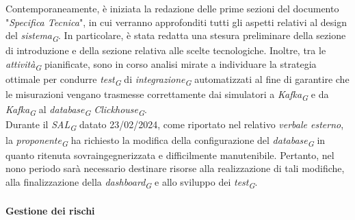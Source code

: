 Contemporaneamente, è iniziata la redazione delle prime sezioni del documento "\textit{Specifica Tecnica}", in cui verranno approfonditi tutti gli aspetti relativi al design del \textit{sistema}\textsubscript{\textit{G}}. In particolare, è stata redatta una stesura preliminare della sezione di introduzione e della sezione relativa alle scelte tecnologiche.
Inoltre, tra le \textit{attività}\textsubscript{\textit{G}} pianificate, sono in corso analisi mirate a individuare la strategia ottimale per condurre \textit{test}\textsubscript{\textit{G}} di \textit{integrazione}\textsubscript{\textit{G}} automatizzati al fine di garantire che le misurazioni vengano trasmesse correttamente dai simulatori a \textit{Kafka}\textsubscript{\textit{G}} e da \textit{Kafka}\textsubscript{\textit{G}} al \textit{database}\textsubscript{\textit{G}} \textit{Clickhouse}\textsubscript{\textit{G}}. \\
Durante il \textit{SAL}\textsubscript{\textit{G}} datato 23/02/2024, come riportato nel relativo \textit{verbale esterno}, la \textit{proponente}\textsubscript{\textit{G}} ha richiesto la modifica della configurazione del \textit{database}\textsubscript{\textit{G}} in quanto ritenuta sovraingegnerizzata e difficilmente manutenibile. Pertanto, nel nono periodo sarà necessario destinare risorse alla realizzazione di tali modifiche, alla finalizzazione della \textit{dashboard}\textsubscript{\textit{G}} e allo sviluppo dei \textit{test}\textsubscript{\textit{G}}.

\paragraph{Gestione dei rischi} 

